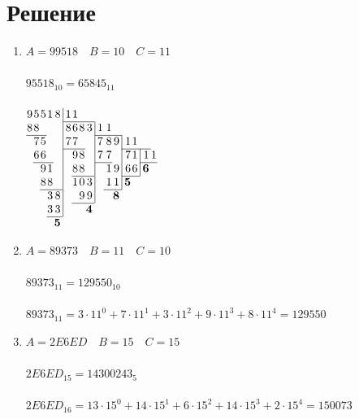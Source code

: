 \documentclass[11pt]{article}
\begin{document}
\section{Решение}
\small
\begin{paracol}{2}
\noindent
\begin{enumerate}
    \item$A = 99518\quad B = 10\quad C = 11$
    \\\\
    $95518_{10} = 65845_{11}$
    \\\\
    $
    \arraycolsep=0.05em
    \begin{array}{rrrrr@{\,}r|rrrr@{\,}r|rrr@{\,}r|rr@{\,}r|r@{\,}r}
    9&5&5&1&8 &&\, 1&1\\
    \cline{7-10}
    8&8 &&&&& 8&6&8&3 &&\, 1&1\\
    \cline{1-3} \cline{12-15}
    & 7&5 && &&\, 7&7&& &&\, 7&8&9 &&\, 1&1\\
    \cline{7-9} \cline{15-19}
    & 6&6 && &&\, &9&8& &&\, 7&7& &&\, 7&1 &&\, 1&1\\
    \cline{2-4} \cline{12-13} \cline{18-20}
    & &9&1& &&\,&8&8 && &&\,1&9 &&\, 6&6 &&\, \textbf{6}\\
    \cline{8-10} \cline{16-18}
    & &8&8& &&\, &1&0&3 &&\, &1&1 &&\, \textbf{5}\\
    \cline{3-5} \cline{13-15}
    &&&3&8 &&\, &&9&9 &&\, &&\textbf{8}\\
    \cline{8-10}
    &&&3&3 &&\, &&&\textbf{4}\\
    \cline{4-5}
    &&&&\textbf{5}\\
    \end{array}
    $
    \item$A = 89373\quad B = 11\quad C = 10$
    \\\\
    $89373_{11} = 129550_{10}$
    \\\\
    $89373_{11} = 3 \cdot 11^0 + 7 \cdot 11^1 + 3 \cdot 11^2 + 9 \cdot 11^3 + 8 \cdot 11^4 = 129550$
    \item$A = 2E6ED\quad B = 15\quad C = 15$
    \\\\
    $2E6ED_{15} = 14300243_{5}$
    \\\\
    $2E6ED_{16} = 13 \cdot 15^0 + 14 \cdot 15^1 + 6 \cdot 15^2 + 14 \cdot 15^3 + 2 \cdot 15^4 = 150073$
    \\\\

\end{enumerate}
\end{paracol}
\end{document}
